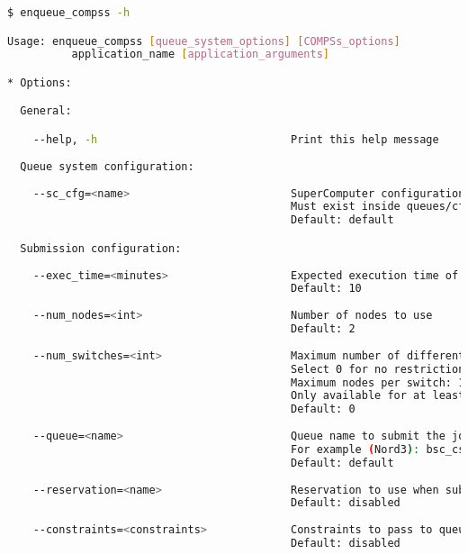 \begin{lstlisting}[language=bash]
$ enqueue_compss -h

Usage: enqueue_compss [queue_system_options] [COMPSs_options] 
          application_name [application_arguments]

* Options:

  General:

    --help, -h                              Print this help message
  
  Queue system configuration:
  
    --sc_cfg=<name>                         SuperComputer configuration file to use.
                                            Must exist inside queues/cfgs/
                                            Default: default

  Submission configuration: 
  
    --exec_time=<minutes>                   Expected execution time of the application (in minutes)
                                            Default: 10
                                            
    --num_nodes=<int>                       Number of nodes to use
                                            Default: 2
                                            
    --num_switches=<int>                    Maximum number of different switches.
                                            Select 0 for no restrictions.
                                            Maximum nodes per switch: 18
                                            Only available for at least 4 nodes. 
                                            Default: 0 
                                            
    --queue=<name>                          Queue name to submit the job. Depends on the queue system.
                                            For example (Nord3): bsc_cs | bsc_debug | debug | interactive
                                            Default: default
                                            
    --reservation=<name>                    Reservation to use when submitting the job. 
                                            Default: disabled
                                            
    --constraints=<constraints>             Constraints to pass to queue system.
                                            Default: disabled
                                            

\end{lstlisting}
